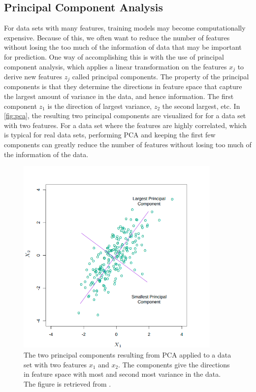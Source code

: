 \subsection{Principal Component Analysis}\label{sec:Principal Component Analysis}
For data sets with many features, training models may become computationally expensive. Because of this, we often want to reduce the number of features without losing the too much of the information of data that may be important for prediction. One way of accomplishing this is with the use of principal component analysis, which applies a linear transformation on the features $x_j$ to derive new features $z_j$ called principal components. The property of the principal components is that they determine the directions in feature space that capture the largest amount of variance in the data, and hence information. The first component $z_1$ is the direction of largest variance, $z_2$ the second largest, etc. In \autoref{fig:pca}, the resulting two principal components are visualized for for a data set with two features. For a data set where the features are highly correlated, which is typical for real data sets, performing PCA and keeping the first few components can greatly reduce the number of features without losing too much of the information of the data.

\begin{figure}[H]
    \centering
    \includegraphics[width=10cm]{latex/figures/pca.png}
    \caption{The two principal components resulting from PCA applied to a data set with two features $x_1$ and $x_2$. The components give the directions in feature space with most and second most variance in the data. The figure is retrieved from \citet{hastie01statisticallearning}.}
    \label{fig:pca}
\end{figure}